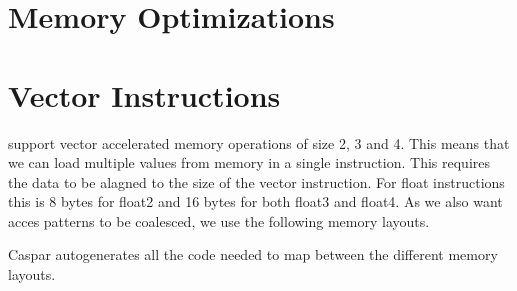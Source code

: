 \section{Memory Optimizations}

\section{Vector Instructions}
\cuda support vector accelerated memory operations of size 2, 3 and 4.
This means that we can load multiple values from memory in a single instruction.
This requires the data to be alagned to the size of the vector instruction.
For float instructions this is 8 bytes for float2 and 16 bytes for both float3 and float4.
As we also want acces patterns to be coalesced, we use the following memory layouts.

Caspar autogenerates all the code needed to map between the different memory layouts.

